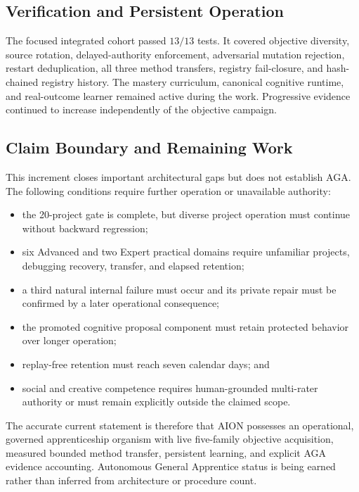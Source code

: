 \subsection{Verification and Persistent Operation}
\label{subsec:aion-aga-gap-verification}

The focused integrated cohort passed $13/13$ tests.  It covered objective
diversity, source rotation, delayed-authority enforcement, adversarial mutation
rejection, restart deduplication, all three method transfers, registry
fail-closure, and hash-chained registry history.  The mastery curriculum,
canonical cognitive runtime, and real-outcome learner remained active during
the work.  Progressive evidence continued to increase independently of the
objective campaign.

\subsection{Claim Boundary and Remaining Work}
\label{subsec:aion-aga-gap-boundary}

This increment closes important architectural gaps but does not establish AGA.
The following conditions require further operation or unavailable authority:
\begin{itemize}[leftmargin=*]
    \item the 20-project gate is complete, but diverse project operation must
          continue without backward regression;
    \item six Advanced and two Expert practical domains require unfamiliar
          projects, debugging recovery, transfer, and elapsed retention;
    \item a third natural internal failure must occur and its private repair
          must be confirmed by a later operational consequence;
    \item the promoted cognitive proposal component must retain protected
          behavior over longer operation;
    \item replay-free retention must reach seven calendar days; and
    \item social and creative competence requires human-grounded multi-rater
          authority or must remain explicitly outside the claimed scope.
\end{itemize}

The accurate current statement is therefore that AION possesses an operational,
governed apprenticeship organism with live five-family objective acquisition,
measured bounded method transfer, persistent learning, and explicit AGA evidence
accounting.  Autonomous General Apprentice status is being earned rather than
inferred from architecture or procedure count.

